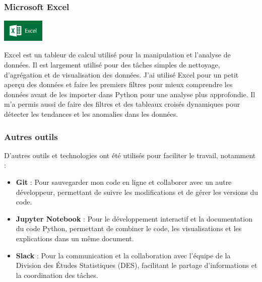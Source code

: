 \subsubsection{Microsoft Excel}
\begin{center}
    \includegraphics[width=0.15\textwidth]{image/excel.png} 
\end{center} 
Excel est un tableur de calcul utilisé pour la manipulation et l'analyse de données. Il est largement utilisé pour des tâches simples de nettoyage, d'agrégation et de visualisation des données. J'ai utilisé Excel pour un petit aperçu des données et faire les premiers filtres pour mieux comprendre les données avant de les importer dans Python pour une analyse plus approfondie. Il m'a permis aussi de faire des filtres et des tableaux croisés dynamiques pour détecter les tendances et les anomalies dans les données. 

\subsubsection{Autres outils} 
D'autres outils et technologies ont été utilisés pour faciliter le travail, notamment :
\begin{itemize}
    \item \textbf{Git} : Pour sauvegarder mon code en ligne et collaborer avec un autre développeur, permettant de suivre les modifications et de gérer les versions du code. 
    \item \textbf{Jupyter Notebook} : Pour le développement interactif et la documentation du code Python, permettant de combiner le code, les visualisations et les explications dans un même document.
    \item \textbf{Slack} : Pour la communication et la collaboration avec l'équipe de la Division des Études Statistiques (DES), facilitant le partage d'informations et la coordination des tâches. 
\end{itemize} 
